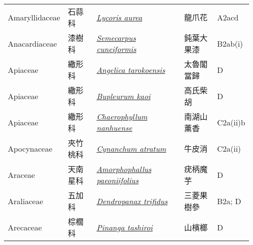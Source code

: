 {\begin{longtable}{L{2.5cm}L{2cm}L{5cm}L{2.5cm}L{3cm}}
    Amaryllidaceae & 石蒜科 & \href{http://www.theplantlist.org/tpl1.1/search?q=Lycoris+aurea}{\textit{Lycoris aurea} } & 龍爪花 & A2acd    \\
    Anacardiaceae & 漆樹科 & \href{http://www.theplantlist.org/tpl1.1/search?q=Semecarpus+cuneiformis}{\textit{Semecarpus cuneiformis} } & 鈍葉大果漆 & B2ab(i)    \\
    Apiaceae & 繖形科 & \href{http://www.theplantlist.org/tpl1.1/search?q=Angelica+tarokoensis}{\textit{Angelica tarokoensis} } & 太魯閣當歸 & D    \\
    Apiaceae & 繖形科 & \href{http://www.theplantlist.org/tpl1.1/search?q=Bupleurum+kaoi}{\textit{Bupleurum kaoi} } & 高氏柴胡 & D    \\
    Apiaceae & 繖形科 & \href{http://www.theplantlist.org/tpl1.1/search?q=Chaerophyllum+nanhuense}{\textit{Chaerophyllum nanhuense} } & 南湖山薰香 & C2a(ii)b    \\
    Apocynaceae & 夾竹桃科 & \href{http://www.theplantlist.org/tpl1.1/search?q=Cynanchum+atratum}{\textit{Cynanchum atratum} } & 牛皮消 & C2a(ii)    \\
    Araceae & 天南星科 & \href{http://www.theplantlist.org/tpl1.1/search?q=Amorphophallus+paeoniifolius}{\textit{Amorphophallus paeoniifolius} } & 疣柄魔芋 & D    \\
    Araliaceae & 五加科 & \href{http://www.theplantlist.org/tpl1.1/search?q=Dendropanax+trifidus}{\textit{Dendropanax trifidus} } & 三菱果樹參 & B2a; D    \\
    Arecaceae & 棕櫚科 & \href{http://www.theplantlist.org/tpl1.1/search?q=Pinanga+tashiroi}{\textit{Pinanga tashiroi} } & 山檳榔 & D    \\

\end{longtable}}
